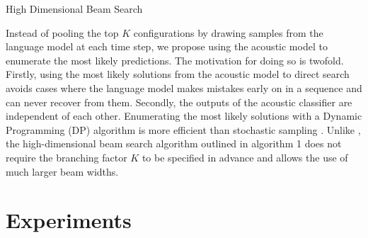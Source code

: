 \documentclass{article}
\DeclareMathOperator*{\argmax}{\arg\!\max}
\begin{document}


\begin{algorithm}
\caption{High Dimensional Beam Search \cite{boulanger2013high}}
\begin{algorithmic}
		\EndFor
	\EndWhile
\EndFor
{}
\end{algorithmic}
\end{algorithm}


Instead of pooling the top $K$ configurations by drawing samples from the language model at each time step, we propose using the acoustic model to enumerate the most likely predictions. The motivation for doing so is twofold. Firstly, using the most likely solutions from the acoustic model to direct search avoids cases where the language model makes mistakes early on in a sequence and can never recover from them. Secondly, the outputs of the acoustic classifier are independent of each other. Enumerating the most likely solutions with a Dynamic Programming (DP) algorithm is more efficient than stochastic sampling \cite{boulanger2013high}. Unlike \cite{boulanger2013high}, the high-dimensional beam search algorithm outlined in algorithm 1 does not require the branching factor $K$ to be specified in advance and allows the use of much larger beam widths.
%
%

\section{Experiments}
\end{document}
